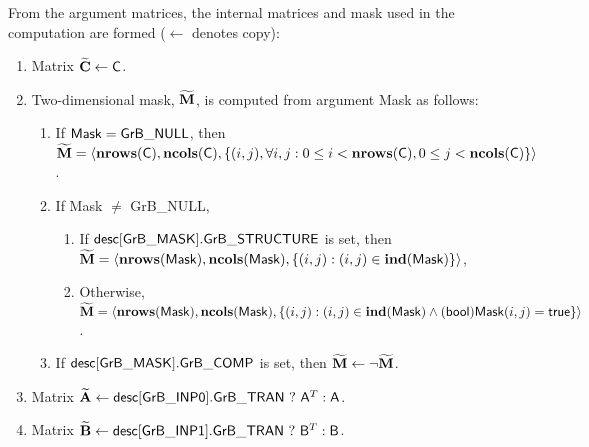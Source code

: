 From the argument matrices, the internal matrices and mask used in 
the computation are formed ($\leftarrow$ denotes copy):
\begin{enumerate}
	\item Matrix ${\bf \widetilde{C}} \leftarrow {\sf C}$.

	\item Two-dimensional mask, ${\bf \widetilde{M}}$, is computed from
    argument {\sf Mask} as follows:
	\begin{enumerate}
		\item If ${\sf Mask} = {\sf GrB\_NULL}$, then ${\bf \widetilde{M}} = 
        \langle \bold{nrows}({\sf C}), \bold{ncols}({\sf C}), \{(i,j), 
        \forall i,j : 0 \leq i <  \bold{nrows}({\sf C}), 0 \leq j < 
        \bold{ncols}({\sf C}) \} \rangle$.

		\item If {\sf Mask} $\ne$ {\sf GrB\_NULL},
        \begin{enumerate}
            \item If ${\sf desc[GrB\_MASK].GrB\_STRUCTURE}$ is set, then 
            ${\bf \widetilde{M}} = \langle \bold{nrows}({\sf Mask}), 
            \bold{ncols}({\sf Mask}), \{(i,j) : (i,j) \in \bold{ind}({\sf Mask}) \} \rangle$,
            \item Otherwise, ${\bf \widetilde{M}} = \langle \bold{nrows}({\sf Mask}), 
            \bold{ncols}({\sf Mask}), \\ \{(i,j) : (i,j) \in \bold{ind}({\sf Mask}) \wedge 
            ({\sf bool}){\sf Mask}(i,j) = {\sf true}\} \rangle$.
        \end{enumerate}

		\item	If ${\sf desc[GrB\_MASK].GrB\_COMP}$ is set, then 
        ${\bf \widetilde{M}} \leftarrow \neg {\bf \widetilde{M}}$.
	\end{enumerate}

	\item Matrix ${\bf \widetilde{A}} \leftarrow
    {\sf desc[GrB\_INP0].GrB\_TRAN} \ ? \ {\sf A}^T : {\sf A}$.

	\item Matrix ${\bf \widetilde{B}} \leftarrow
    {\sf desc[GrB\_INP1].GrB\_TRAN} \ ? \ {\sf B}^T : {\sf B}$.
\end{enumerate}

